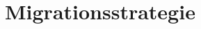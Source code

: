﻿\documentclass[12pt,a4paper]{article}
\begin{document}
%

\section{Migrationsstrategie}
\label{sec:migration}
\end{document}
